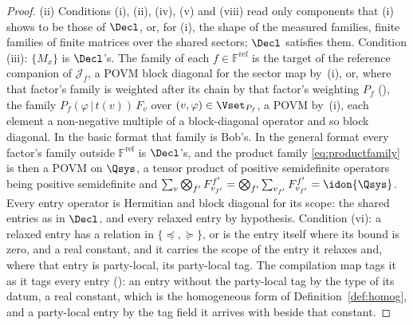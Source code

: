 \begin{proof}
(ii) Conditions (i), (ii), (iv), (v) and (viii) read only components that
(i) shows to be those of $\Decl$, or, for (i), the shape of the measured
families, finite families of finite matrices over the shared sectors;
$\Decl$ satisfies them. Condition (iii): $\{M_x\}$ is $\Decl$'s. The family
of each $f\in\mathbb{F}^{\mathrm{ref}}$ is the target of the reference
companion of $\mathcal{J}_f$, a POVM block diagonal for the sector map by
\,(i), or, where that factor's
family is weighted after its chain by that factor's weighting $P_f$
(), the family
$P_f(\varphi\,|\,t(v))\,F_v$ over $(v,\varphi)\in\Vset_{P_f}$, a POVM
by \,(i), each element a non-negative
multiple of a block-diagonal operator and so block diagonal. In the basic
format that family is Bob's. In the general format every factor's family
outside $\mathbb{F}^{\mathrm{ref}}$ is $\Decl$'s, and the product family
\eqref{eq:productfamily} is then a POVM on $\Qsys$, a tensor product of
positive semidefinite operators being positive semidefinite and
$\sum_{v}\bigotimes_{f'}F^{f'}_{v_{f'}}=\bigotimes_{f'}\sum_{v_{f'}}F^{f'}_{v_{f'}}
=\idon{\Qsys}$. Every entry operator is Hermitian and block diagonal for its
scope: the shared entries as in $\Decl$, and every relaxed entry by
hypothesis. Condition (vi): a relaxed entry has a relation in
$\{\preceq,\succeq\}$, or is the entry itself where its bound is zero, and a
real constant, and it carries the scope of the entry it relaxes and, where
that entry is party-local, its party-local tag. The compilation map tags it
as it tags every entry (): an entry
without the party-local tag by the type of its datum, a real constant,
which is the homogeneous form of Definition~\ref{def:homog}, and a
party-local entry by the tag field it arrives with beside that constant.


\end{proof}
